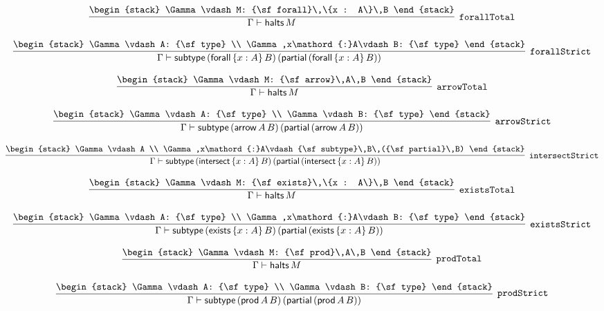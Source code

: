 \[
\infer[{\tt forallTotal}]{\Gamma \vdash {\sf halts}\,M}{
\begin{stack}
\Gamma \vdash M: {\sf forall}\,\{x : A\}\,B
\end{stack}}
\]

\[
\infer[{\tt forallStrict}]{\Gamma \vdash {\sf subtype}\,({\sf forall}\,\{x : A\}\,B)\,({\sf partial}\,({\sf forall}\,\{x : A\}\,B))}{
\begin{stack}
\Gamma \vdash A: {\sf type}
\\
\Gamma ,x\mathord{:}A\vdash B: {\sf type}
\end{stack}}
\]

\[
\infer[{\tt arrowTotal}]{\Gamma \vdash {\sf halts}\,M}{
\begin{stack}
\Gamma \vdash M: {\sf arrow}\,A\,B
\end{stack}}
\]

\[
\infer[{\tt arrowStrict}]{\Gamma \vdash {\sf subtype}\,({\sf arrow}\,A\,B)\,({\sf partial}\,({\sf arrow}\,A\,B))}{
\begin{stack}
\Gamma \vdash A: {\sf type}
\\
\Gamma \vdash B: {\sf type}
\end{stack}}
\]

\[
\infer[{\tt intersectStrict}]{\Gamma \vdash {\sf subtype}\,({\sf intersect}\,\{x : A\}\,B)\,({\sf partial}\,({\sf intersect}\,\{x : A\}\,B))}{
\begin{stack}
\Gamma \vdash A
\\
\Gamma ,x\mathord{:}A\vdash {\sf subtype}\,B\,({\sf partial}\,B)
\end{stack}}
\]

\[
\infer[{\tt existsTotal}]{\Gamma \vdash {\sf halts}\,M}{
\begin{stack}
\Gamma \vdash M: {\sf exists}\,\{x : A\}\,B
\end{stack}}
\]

\[
\infer[{\tt existsStrict}]{\Gamma \vdash {\sf subtype}\,({\sf exists}\,\{x : A\}\,B)\,({\sf partial}\,({\sf exists}\,\{x : A\}\,B))}{
\begin{stack}
\Gamma \vdash A: {\sf type}
\\
\Gamma ,x\mathord{:}A\vdash B: {\sf type}
\end{stack}}
\]

\[
\infer[{\tt prodTotal}]{\Gamma \vdash {\sf halts}\,M}{
\begin{stack}
\Gamma \vdash M: {\sf prod}\,A\,B
\end{stack}}
\]

\[
\infer[{\tt prodStrict}]{\Gamma \vdash {\sf subtype}\,({\sf prod}\,A\,B)\,({\sf partial}\,({\sf prod}\,A\,B))}{
\begin{stack}
\Gamma \vdash A: {\sf type}
\\
\Gamma \vdash B: {\sf type}
\end{stack}}
\]

